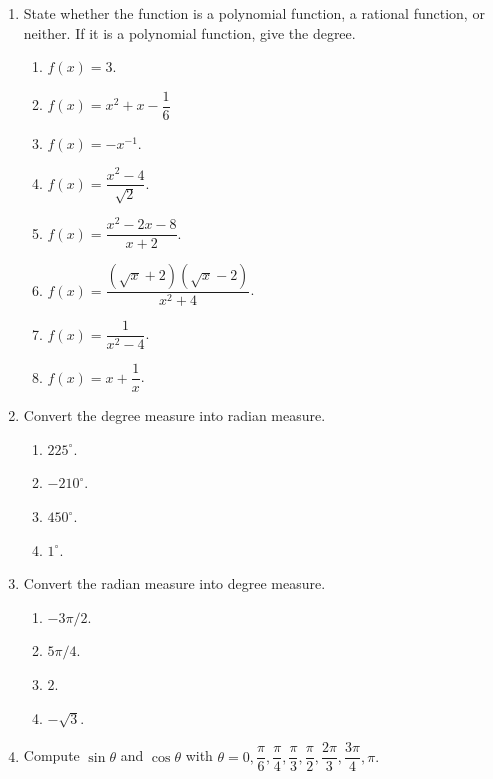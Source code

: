 \documentclass[11pt]{book}
\theoremstyle{break}
\theoremstyle{no_label}
\numberwithin{equation}{section}
\begin{document}
\begin{enumerate}[label=\arabic*.]
    \item State whether the function is a polynomial function, a rational function, or neither. If it is a polynomial function, give the degree.
    \begin{multicols}{2}
        \begin{enumerate}
            \item $f(x)=3$.
            \item $f(x)=x^2+x-\dfrac{1}{6}$
            \item $f(x)=-x^{-1}$.
            \item $f(x)=\dfrac{x^2-4}{\sqrt{2}}$.
            \item $f(x)=\dfrac{x^2-2x-8}{x+2}$.
            \item $f(x)=\dfrac{(\sqrt{x}+2)(\sqrt{x}-2)}{x^2+4}$.
            \item $f(x)=\dfrac{1}{x^2-4}$.
            \item $f(x)=x+\dfrac{1}{x}$.
        \end{enumerate}
    \end{multicols}
    \item Convert the degree measure into radian measure.
    \begin{multicols}{4}
        \begin{enumerate}
            \item $225^\circ$.
            \item $-210^\circ$.
            \item $450^\circ$.
            \item $1^\circ$.
        \end{enumerate}
    \end{multicols}
    \item Convert the radian measure into degree measure.
    \begin{multicols}{4}
        \begin{enumerate}
            \item $-3\pi/2$.
            \item $5\pi/4$.
            \item $2$.
            \item $-\sqrt{3}$.
        \end{enumerate}
    \end{multicols}
    \item Compute $\sin\theta$ and $\cos\theta$ with $\theta=0, \dfrac{\pi}{6}, \dfrac{\pi}{4}, \dfrac{\pi}{3}, \dfrac{\pi}{2}, \dfrac{2\pi}{3}, \dfrac{3\pi}{4}, \pi.$

\end{enumerate}
\end{document}
